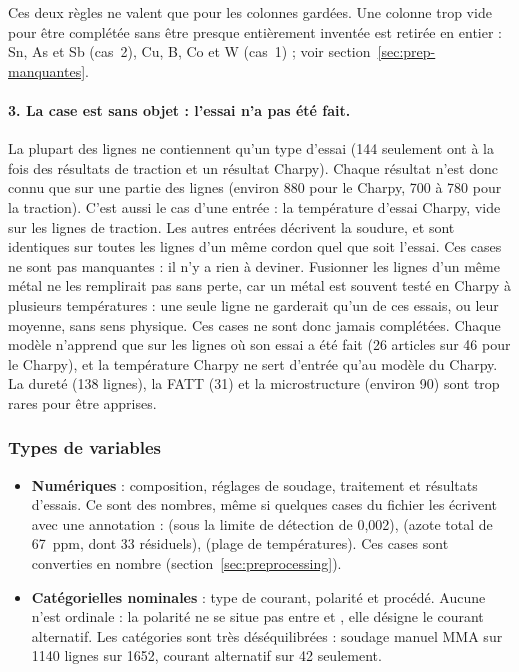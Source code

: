Ces deux règles ne valent que pour les colonnes gardées. Une colonne trop vide pour être
complétée sans être presque entièrement inventée est retirée en entier : Sn, As et Sb
(cas~2), Cu, B, Co et W (cas~1) ; voir section~\ref{sec:prep-manquantes}.

\paragraph{3. La case est sans objet : l'essai n'a pas été fait.} La plupart des lignes ne
contiennent qu'un type d'essai (144 seulement ont à la fois des résultats de traction et un
résultat Charpy). Chaque résultat n'est donc connu que sur une partie des lignes (environ
880 pour le Charpy, 700 à 780 pour la traction). C'est aussi le cas d'une entrée : la
température d'essai Charpy, vide sur les lignes de traction. Les autres entrées décrivent
la soudure, et sont identiques sur toutes les lignes d'un même cordon quel que soit
l'essai. Ces cases ne sont pas manquantes : il n'y a rien à deviner. Fusionner les lignes
d'un même métal ne les remplirait pas sans perte, car un métal est souvent testé en Charpy
à plusieurs températures : une seule ligne ne garderait qu'un de ces essais, ou leur
moyenne, sans sens physique. Ces cases ne sont donc jamais complétées. Chaque modèle
n'apprend que sur les lignes où son essai a été fait (26 articles sur 46 pour le Charpy),
et la température Charpy ne sert d'entrée qu'au modèle du Charpy. La dureté (138 lignes),
la FATT (31) et la microstructure (environ 90) sont trop rares pour être apprises.


\subsubsection{Types de variables}

\begin{itemize}
  \item \textbf{Numériques} : composition, réglages de soudage, traitement et résultats
    d'essais. Ce sont des nombres, même si quelques cases du fichier les écrivent avec une
    annotation :  (sous la limite de détection de 0,002), 
    (azote total de 67~ppm, dont 33 résiduels),  (plage de températures).
    Ces cases sont converties en nombre (section~\ref{sec:preprocessing}).
  \item \textbf{Catégorielles nominales} : type de courant, polarité et procédé. Aucune
    n'est ordinale : la polarité  ne se situe pas entre \code{+} et \code{-},
    elle désigne le courant alternatif. Les catégories sont très déséquilibrées : soudage
    manuel MMA sur 1140 lignes sur 1652, courant alternatif sur 42 seulement.
\end{itemize}

